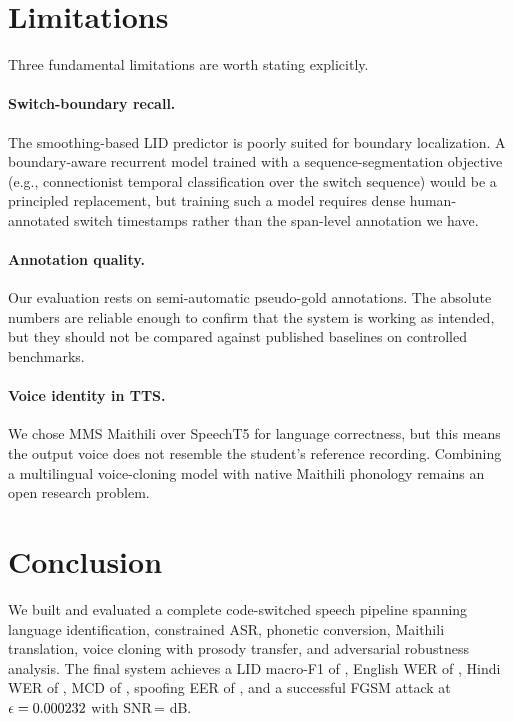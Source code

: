 \documentclass[10pt,twocolumn,letterpaper]{article}
\begin{document}
\section{Limitations}
\label{sec:limits}

Three fundamental limitations are worth stating explicitly.

\paragraph{Switch-boundary recall.}
The smoothing-based LID predictor is poorly suited for boundary
localization.  A boundary-aware recurrent model trained with a
sequence-segmentation objective (e.g., connectionist temporal
classification over the switch sequence) would be a principled
replacement, but training such a model requires dense human-annotated
switch timestamps rather than the span-level annotation we have.

\paragraph{Annotation quality.}
Our evaluation rests on semi-automatic pseudo-gold annotations.
The absolute numbers are reliable enough to confirm that the system
is working as intended, but they should not be compared against
published baselines on controlled benchmarks.

\paragraph{Voice identity in TTS.}
We chose MMS Maithili over SpeechT5 for language correctness, but
this means the output voice does not resemble the student's reference
recording.  Combining a multilingual voice-cloning model with native
Maithili phonology remains an open research problem.

\section{Conclusion}
\label{sec:conclusion}

We built and evaluated a complete code-switched speech pipeline spanning
language identification, constrained ASR, phonetic conversion, Maithili
translation, voice cloning with prosody transfer, and adversarial
robustness analysis.  The final system achieves a LID macro-F1 of
\LIDMacroFOne, English WER of \EnglishWER, Hindi WER of \HindiWER,
MCD of \MCDLectureMMS, spoofing EER of \SpoofEER, and a successful
FGSM attack at $\epsilon=0.000232$ with SNR\,=\,\FGSMSNR\,dB.
\end{document}
